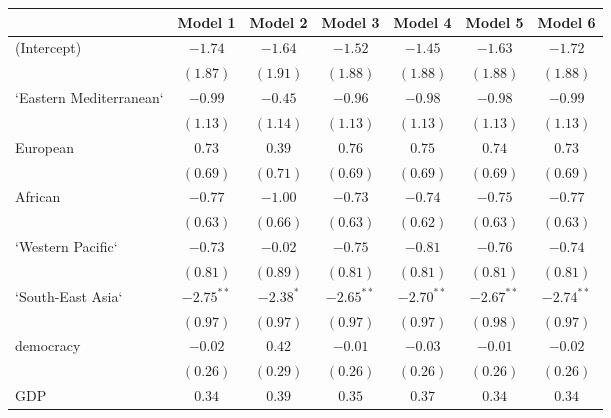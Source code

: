 
\begin{table}[!h]
\begin{center}
\begin{tabular}{l c c c c c c }
\toprule
 & Model 1 & Model 2 & Model 3 & Model 4 & Model 5 & Model 6 \\
\midrule
(Intercept)             & $-1.74$      & $-1.64$      & $-1.52$      & $-1.45$      & $-1.63$      & $-1.72$      \\
                        & $(1.87)$     & $(1.91)$     & $(1.88)$     & $(1.88)$     & $(1.88)$     & $(1.88)$     \\
`Eastern Mediterranean` & $-0.99$      & $-0.45$      & $-0.96$      & $-0.98$      & $-0.98$      & $-0.99$      \\
                        & $(1.13)$     & $(1.14)$     & $(1.13)$     & $(1.13)$     & $(1.13)$     & $(1.13)$     \\
European                & $0.73$       & $0.39$       & $0.76$       & $0.75$       & $0.74$       & $0.73$       \\
                        & $(0.69)$     & $(0.71)$     & $(0.69)$     & $(0.69)$     & $(0.69)$     & $(0.69)$     \\
African                 & $-0.77$      & $-1.00$      & $-0.73$      & $-0.74$      & $-0.75$      & $-0.77$      \\
                        & $(0.63)$     & $(0.66)$     & $(0.63)$     & $(0.62)$     & $(0.63)$     & $(0.63)$     \\
`Western Pacific`       & $-0.73$      & $-0.02$      & $-0.75$      & $-0.81$      & $-0.76$      & $-0.74$      \\
                        & $(0.81)$     & $(0.89)$     & $(0.81)$     & $(0.81)$     & $(0.81)$     & $(0.81)$     \\
`South-East Asia`       & $-2.75^{**}$ & $-2.38^{*}$  & $-2.65^{**}$ & $-2.70^{**}$ & $-2.67^{**}$ & $-2.74^{**}$ \\
                        & $(0.97)$     & $(0.97)$     & $(0.97)$     & $(0.97)$     & $(0.98)$     & $(0.97)$     \\
democracy               & $-0.02$      & $0.42$       & $-0.01$      & $-0.03$      & $-0.01$      & $-0.02$      \\
                        & $(0.26)$     & $(0.29)$     & $(0.26)$     & $(0.26)$     & $(0.26)$     & $(0.26)$     \\
GDP                     & $0.34$       & $0.39$       & $0.35$       & $0.37$       & $0.34$       & $0.34$       \\

\end{tabular}
\end{center}
\end{table}
